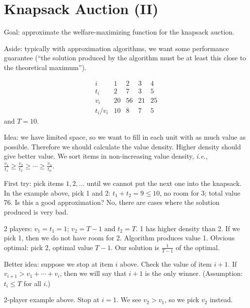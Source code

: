 \documentclass[12pt,letterpaper]{report}
\begin{document}
\section{Knapsack Auction (II)}

Goal: approximate the welfare-maximizing function for the knapsack auction.

Aside: typically with approximation algorithms, we want some performance guarantee (``the solution
produced by the algorithm must be at least this close to the theoretical maximum'').

\begin{ex}
  \[
    \begin{array}{c|cccc}
      i & 1 & 2 & 3 & 4 \\
      \hline
      t_i & 2 & 7 & 3 & 5 \\
      v_i & 20 & 56 & 21 & 25 \\
      t_i / v_i & 10 & 8 & 7 & 5
    \end{array}
  \]
  and $T = 10$.
\end{ex}

Idea: we have limited space, so we want to fill in each unit with as much value as possible.
Therefore we should calculate the value density.
Higher density should give better value.
We sort items in non-increasing value density, \emph{i.e.},
$\frac{v_1}{t_1} \geq \frac{v_2}{t_2} \geq \cdots \geq \frac{v_n}{t_n}$.

First try: pick items $1, 2, \ldots$ until we cannot put the next one into the knapsack.
In the example above, pick 1 and 2: $t_1 + t_2 = 9 \leq 10$, no room for 3; total value 76.
Is this a good approximation?
No, there are cases where the solution produced is very bad.

\begin{ex}
  2 players: $v_1 = t_1 = 1$; $v_2 = T - 1$ and $t_2 = T$.
  1 has higher density than 2.
  If we pick 1, then we do not have room for 2.
  Algorithm produces value 1.
  Obvious optimal: pick 2, optimal value $T - 1$.
  Our solution is $\frac{1}{T - 1}$ of the optimal.
\end{ex}

Better idea: suppose we stop at item $i$ above.
Check the value of item $i + 1$.
If $v_{i + 1} > v_1 + \cdots + v_i$, then we will say that $i + 1$ is the only winner.
(Assumption: $t_i \leq T$ for all $i$.)

\begin{ex}
  2-player example above.
  Stop at $i = 1$.
  We see $v_2 > v_1$, so we pick $v_2$ instead.
\end{ex}
\end{document}
